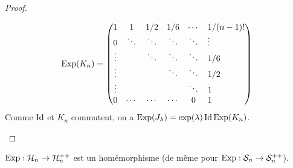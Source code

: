 \begin{proof}
\begin{enumerate}
\begin{displaymath}
   \Exp(K_n) =  \begin{pmatrix}
 1      & 1       & 1/2    & 1/6    & \cdots & 1/(n-1)! \\
 0      & \ddots  & \ddots & \ddots & \ddots & \vdots\hfill \\
 \vdots &         & \ddots & \ddots & \ddots & 1/6 \hfill  \\
 \vdots &         &        & \ddots & \ddots & 1/2 \hfill \\
 \vdots &         &        &        & \ddots & 1 \hfill \\
 0      & \cdots  & \cdots & \cdots & 0      & 1 \hfill \\

 \end{pmatrix}
\end{displaymath}
Comme $\operatorname{Id}$ et $K_n$ commutent, on a $\operatorname{Exp}(J_\lambda) =
\exp(\lambda)\operatorname{Id}\operatorname{Exp}(K_n)$.
 \end{enumerate}
\end{proof}

\begin{prop}
 
$\operatorname{Exp} : \mathcal{H}_n \rightarrow \mathcal{H}^{++}_n$ est un homémorphisme (de même pour  
$\operatorname{Exp} : \mathcal{S}_n \rightarrow \mathcal{S}^{++}_n$).
\end{prop}

